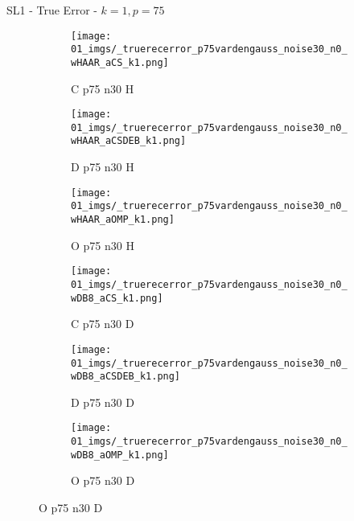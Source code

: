 \begin{frame}{SL1 - True Error - $k=1,p=75$}{}
\begin{figure}
\vspace{5pt}

\begin{subfigure}{0.13\textwidth}
\texttt{[image: 01\_imgs/\_truerecerror\_p75vardengauss\_noise30\_n0\_wHAAR\_aCS\_k1.png]}
\caption*{\tiny C p75 n30 H}
\end{subfigure}
\begin{subfigure}{0.13\textwidth}
\texttt{[image: 01\_imgs/\_truerecerror\_p75vardengauss\_noise30\_n0\_wHAAR\_aCSDEB\_k1.png]}
\caption*{\tiny D p75 n30 H}
\end{subfigure}
\begin{subfigure}{0.13\textwidth}
\texttt{[image: 01\_imgs/\_truerecerror\_p75vardengauss\_noise30\_n0\_wHAAR\_aOMP\_k1.png]}
\caption*{\tiny O p75 n30 H}
\end{subfigure}
\begin{subfigure}{0.13\textwidth}
\texttt{[image: 01\_imgs/\_truerecerror\_p75vardengauss\_noise30\_n0\_wDB8\_aCS\_k1.png]}
\caption*{\tiny C p75 n30 D}
\end{subfigure}
\begin{subfigure}{0.13\textwidth}
\texttt{[image: 01\_imgs/\_truerecerror\_p75vardengauss\_noise30\_n0\_wDB8\_aCSDEB\_k1.png]}
\caption*{\tiny D p75 n30 D}
\end{subfigure}
\begin{subfigure}{0.13\textwidth}
\texttt{[image: 01\_imgs/\_truerecerror\_p75vardengauss\_noise30\_n0\_wDB8\_aOMP\_k1.png]}
\caption*{\tiny O p75 n30 D}
\end{subfigure}
\end{figure}
\end{frame}


